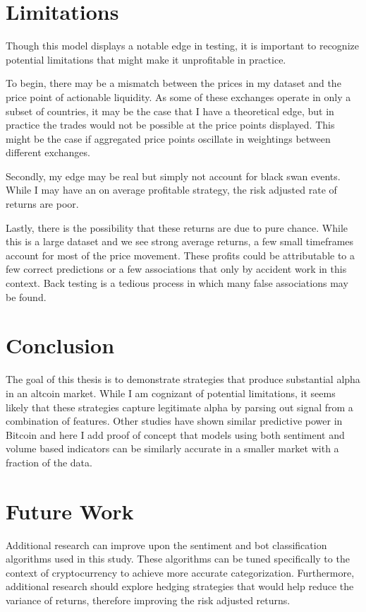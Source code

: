\documentclass[12pt,twoside]{dukestatscithesis}
\begin{document}
\section{Limitations}\label{limitations}

Though this model displays a notable edge in testing, it is important to
recognize potential limitations that might make it unprofitable in
practice.

To begin, there may be a mismatch between the prices in my dataset and
the price point of actionable liquidity. As some of these exchanges
operate in only a subset of countries, it may be the case that I have a
theoretical edge, but in practice the trades would not be possible at
the price points displayed. This might be the case if aggregated price
points oscillate in weightings between different exchanges.

Secondly, my edge may be real but simply not account for black swan
events. While I may have an on average profitable strategy, the risk
adjusted rate of returns are poor.

Lastly, there is the possibility that these returns are due to pure
chance. While this is a large dataset and we see strong average returns,
a few small timeframes account for most of the price movement. These
profits could be attributable to a few correct predictions or a few
associations that only by accident work in this context. Back testing is
a tedious process in which many false associations may be found.

\section{Conclusion}\label{conclusion}

The goal of this thesis is to demonstrate strategies that produce
substantial alpha in an altcoin market. While I am cognizant of
potential limitations, it seems likely that these strategies capture
legitimate alpha by parsing out signal from a combination of features.
Other studies have shown similar predictive power in Bitcoin and here I
add proof of concept that models using both sentiment and volume based
indicators can be similarly accurate in a smaller market with a fraction
of the data.

\section{Future Work}\label{future-work}

Additional research can improve upon the sentiment and bot
classification algorithms used in this study. These algorithms can be
tuned specifically to the context of cryptocurrency to achieve more
accurate categorization. Furthermore, additional research should explore
hedging strategies that would help reduce the variance of returns,
therefore improving the risk adjusted returns.
\end{document}
